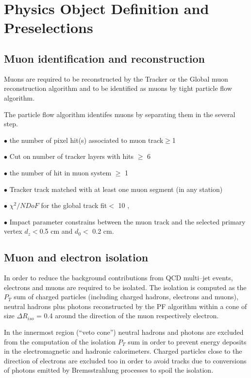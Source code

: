 \section{Physics Object Definition and Preselections}
\label{sect:objdef}



\subsection{Muon identification and reconstruction}


Muons are required to be reconstructed by the Tracker or the Global muon reconstruction algorithm and to be identified as 
muons by tight particle flow algorithm.

The particle flow algorithm identifes  muons by separating them in the several step.


$\bullet$  the number of pixel hit(s) associated to muon track$\geq $1

$\bullet$  Cut on number of tracker layers with hits $\geq $ 6

$\bullet$ the number of hit in muon system $\geq $ 1

$\bullet$ Tracker track matched with at least one muon segment (in any station)

$\bullet$ $\chi ^{2}/NDoF $ for the global track fit$< $ 10 ,

$\bullet$ Impact parameter constrains between the muon track and the selected primary vertex 
 $d_{z} < $0.5 cm and $d_{0} <$ 0.2 cm.

\subsection{Muon and electron isolation}

In order to reduce the background contributions from QCD multi–jet events, electrons and
muons are required to be isolated. The isolation is computed as the $P_{T}$ sum of charged particles (including charged hadrons, 
electrons and muons), neutral hadrons plus photons reconstructed by the PF algorithm within a cone of size
$\Delta R_{iso}$ = 0.4 around the direction of the muon respectively electron. 


In the innermost region
(``veto cone'') neutral
hadrons and photons  are excluded from the computation of the isolation $P_{T}$ sum in order to prevent energy deposits in the electromagnetic and hadronic
calorimeters. Charged particles close to the direction of electrons  are excluded too in order to avoid tracks due to conversions of photons emitted by Bremsstrahlung processes to spoil the isolation.

